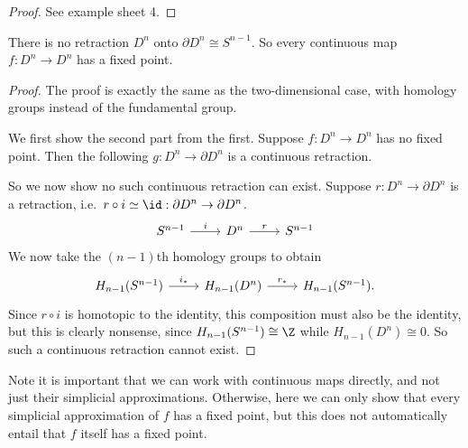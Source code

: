 \documentclass[a4paper]{article}
\begin{document}
\begin{proof}
  See example sheet 4.
\end{proof}

\begin{thm}
  There is no retraction $D^n$ onto $\partial D^n \cong S^{n - 1}$. So every continuous map $f: D^n \to D^n$ has a fixed point.
\end{thm}

\begin{proof}
  The proof is exactly the same as the two-dimensional case, with homology groups instead of the fundamental group.

  We first show the second part from the first. Suppose $f: D^n \to D^n$ has no fixed point. Then the following $g: D^n \to \partial D^n$ is a continuous retraction.
  \begin{center}
  \end{center}
  So we now show no such continuous retraction can exist. Suppose $r: D^n \to \partial D^n$ is a retraction, i.e.\ $r \circ i \simeq \id: \partial D^n \to \partial D^n$.
  \[
    \begin{tikzcd}
      S^{n - 1} \ar[r, "i"] & D^n \ar[r, "r"] & S^{n - 1}
    \end{tikzcd}
  \]
  We now take the $(n - 1)$th homology groups to obtain
  \[
    \begin{tikzcd}
      H_{n - 1}(S^{n - 1}) \ar[r, "i_*"] & H_{n - 1}(D^{n}) \ar[r, "r_*"] & H_{n - 1}(S^{n - 1}).
    \end{tikzcd}
  \]
  Since $r \circ i$ is homotopic to the identity, this composition must also be the identity, but this is clearly nonsense, since $H_{n - 1}(S^{n - 1}) \cong \Z$ while $H_{n - 1}(D^n) \cong 0$. So such a continuous retraction cannot exist.
\end{proof}
Note it is important that we can work with continuous maps directly, and not just their simplicial approximations. Otherwise, here we can only show that every simplicial approximation of $f$ has a fixed point, but this does not automatically entail that $f$ itself has a fixed point.
\end{document}
